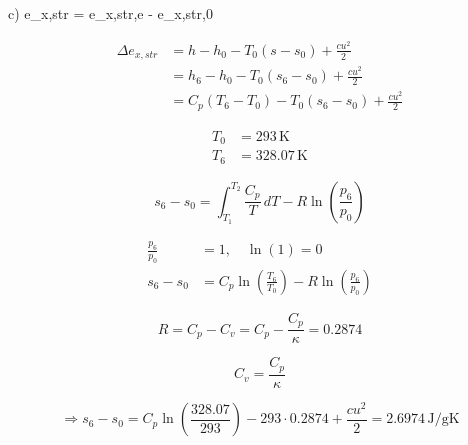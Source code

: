 c) \quad \Delta e_{x,str} = e_{x,str,e} - e_{x,str,0}

\[
\begin{aligned}
    \Delta e_{x,str} &= h - h_0 - T_0 (s - s_0) + \frac{c u^2}{2} \\
    &= h_6 - h_0 - T_0 (s_6 - s_0) + \frac{c u^2}{2} \\
    &= C_p (T_6 - T_0) - T_0 (s_6 - s_0) + \frac{c u^2}{2}
\end{aligned}
\]

\[
\begin{aligned}
    T_0 &= 293 \, \text{K} \\
    T_6 &= 328.07 \, \text{K}
\end{aligned}
\]

\[
s_6 - s_0 = \int_{T_1}^{T_2} \frac{C_p}{T} \, dT - R \ln \left( \frac{p_6}{p_0} \right)
\]

\[
\begin{aligned}
    \frac{p_6}{p_0} &= 1, \quad \ln(1) = 0 \\
    s_6 - s_0 &= C_p \ln \left( \frac{T_6}{T_0} \right) - R \ln \left( \frac{p_6}{p_0} \right)
\end{aligned}
\]

\[
R = C_p - C_v = C_p - \frac{C_p}{\kappa} = 0.2874
\]

\[
C_v = \frac{C_p}{\kappa}
\]

\[
\Rightarrow s_6 - s_0 = C_p \ln \left( \frac{328.07}{293} \right) - 293 \cdot 0.2874 + \frac{c u^2}{2} = 2.6974 \, \text{J/gK}
\]